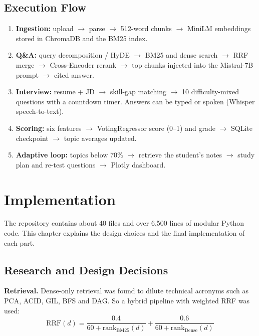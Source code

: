 \documentclass[11pt,a4paper]{report}
\begin{document}
\section{Execution Flow}
\begin{enumerate}
  \item \textbf{Ingestion:} upload $\rightarrow$ parse $\rightarrow$ 512-word chunks $\rightarrow$ MiniLM embeddings stored in ChromaDB and the BM25 index.
  \item \textbf{Q\&A:} query decomposition / HyDE $\rightarrow$ BM25 and dense search $\rightarrow$ RRF merge $\rightarrow$ Cross-Encoder rerank $\rightarrow$ top chunks injected into the Mistral-7B prompt $\rightarrow$ cited answer.
  \item \textbf{Interview:} resume + JD $\rightarrow$ skill-gap matching $\rightarrow$ 10 difficulty-mixed questions with a countdown timer. Answers can be typed or spoken (Whisper speech-to-text).
  \item \textbf{Scoring:} six features $\rightarrow$ VotingRegressor score (0--1) and grade $\rightarrow$ SQLite checkpoint $\rightarrow$ topic averages updated.
  \item \textbf{Adaptive loop:} topics below 70\% $\rightarrow$ retrieve the student's notes $\rightarrow$ study plan and re-test questions $\rightarrow$ Plotly dashboard.
\end{enumerate}

\chapter{Implementation}

The repository contains about {40} files and over {6,500} lines of modular Python code. This chapter explains the design choices and the final implementation of each part.

\section{Research and Design Decisions}

\textbf{Retrieval.} Dense-only retrieval was found to dilute technical acronyms such as PCA, ACID, GIL, BFS and DAG. So a hybrid pipeline with weighted RRF was used:
\begin{equation}
  \mathrm{RRF}(d) = \frac{0.4}{60 + \mathrm{rank}_{\mathrm{BM25}}(d)} + \frac{0.6}{60 + \mathrm{rank}_{\mathrm{Dense}}(d)}
  \label{eq:rrf}
\end{equation}
\end{document}

